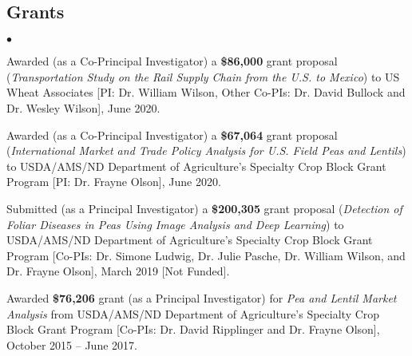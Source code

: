 \documentclass[margin,line]{res}
\newenvironment{list2}{
  \begin{list}{$\bullet$}{%
    \setlength{\itemsep}{0in}
    \setlength{\parsep}{0in} \setlength{\parskip}{0in}
    \setlength{\topsep}{0in} \setlength{\partopsep}{0in}
    \setlength{\leftmargin}{0.2in}}}{\end{list}}
\begin{document}
\begin{resume}
\section{\sc Grants}
\begin{list2}
\item Awarded (as a Co-Principal Investigator) a \textbf{\$86,000} grant proposal ({\em Transportation Study on the Rail Supply Chain from the U.S. to Mexico}) to US Wheat Associates [PI: Dr. William Wilson, Other Co-PIs: Dr. David Bullock and Dr. Wesley Wilson], June 2020.
\item Awarded (as a Co-Principal Investigator) a \textbf{\$67,064} grant proposal ({\em International Market and Trade Policy Analysis for U.S. Field Peas and Lentils}) to USDA/AMS/ND Department of Agriculture's Specialty Crop Block Grant Program [PI: Dr. Frayne Olson], June 2020.
\item Submitted (as a Principal Investigator) a \textbf{\$200,305} grant proposal ({\em Detection of Foliar Diseases in Peas Using Image Analysis and Deep Learning}) to USDA/AMS/ND Department of Agriculture's Specialty Crop Block Grant Program [Co-PIs: Dr. Simone Ludwig, Dr. Julie Pasche, Dr. William Wilson, and Dr. Frayne Olson], March 2019 [Not Funded].
\item Awarded \textbf{\$76,206} grant (as a Principal Investigator) for {\em Pea and Lentil Market Analysis} from USDA/AMS/ND  Department of Agriculture's Specialty Crop Block Grant Program [Co-PIs: Dr. David Ripplinger and Dr. Frayne Olson], October 2015 -- June 2017.
\end{list2}


\end{resume}
\end{document}
